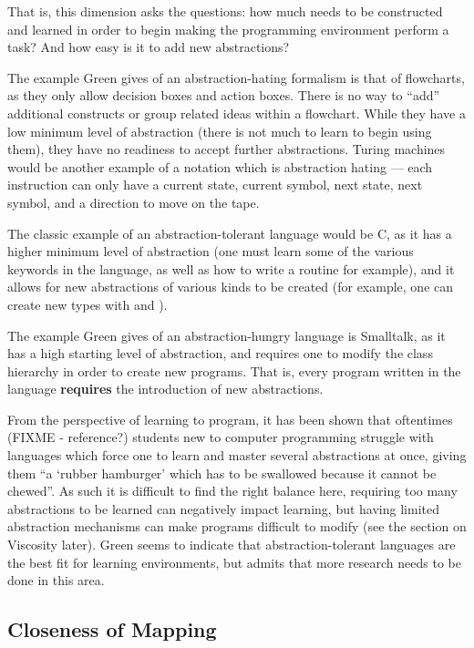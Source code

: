 That is, this dimension asks the questions: how much needs to be constructed and learned in order to begin making the programming
environment perform a task?  And how easy is it to add new abstractions?  

The example Green gives of an abstraction-hating formalism is that of flowcharts, as they only allow decision boxes 
and action boxes.  There is no way to ``add'' additional constructs or group related ideas within a flowchart.  While they 
have a low minimum level of abstraction (there is not much to learn to begin using them), they have no readiness to accept
further abstractions.  Turing 
machines would be another example of a notation which is abstraction hating --- each instruction can only have a current 
state, current symbol, next state, next symbol, and a direction to move on the tape.

The classic example of an abstraction-tolerant language would be C, as it has a higher minimum level of abstraction (one must
learn some of the various keywords in the language, as well as how to write a  routine for example), and it allows
for new abstractions of various kinds to be created (for example, one can create new types with  and ).

The example Green gives of an abstraction-hungry language is Smalltalk, as it has a high starting level of abstraction, 
and requires one to modify the class hierarchy in order to create new programs.  That is, every program written in the
language \textbf{requires} the introduction of new abstractions.

From the perspective of learning to program, it has been shown that oftentimes (FIXME - reference?)
students new to computer programming struggle with languages which force one to learn and master several 
abstractions at once, giving them ``a `rubber hamburger' which has to be swallowed because it cannot be chewed''\cite{green96}.
As such it is difficult to find the right balance here, requiring too many abstractions to be learned can negatively
impact learning, but having limited abstraction mechanisms can make programs difficult to modify (see the section on Viscosity
later).  Green seems to indicate that abstraction-tolerant languages are the best fit for learning environments, but admits
that more research needs to be done in this area.

\subsection{Closeness of Mapping}
\label{closenessoutline}

